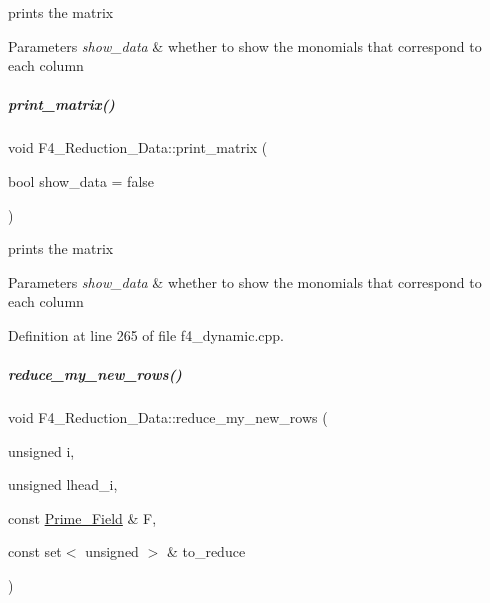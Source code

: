 prints the matrix 


\begin{DoxyParams}{Parameters}
{\em show\+\_\+data} & whether to show the monomials that correspond to each column \\
\hline
\end{DoxyParams}
\mbox{\label{group___g_b_computation_a9f3e9b5617084c34f97acd23d6e67a43}} 
\subparagraph{\texorpdfstring{print\+\_\+matrix()}{print\_matrix()}\hspace{0.1cm}{\footnotesize\ttfamily [2/2]}}
{\footnotesize\ttfamily void F4\+\_\+\+Reduction\+\_\+\+Data\+::print\+\_\+matrix (\begin{DoxyParamCaption}\item[{bool}]{show\+\_\+data = {\ttfamily false} }\end{DoxyParamCaption})}



prints the matrix 


\begin{DoxyParams}{Parameters}
{\em show\+\_\+data} & whether to show the monomials that correspond to each column \\
\hline
\end{DoxyParams}


Definition at line 265 of file f4\+\_\+dynamic.\+cpp.

\mbox{\label{group___g_b_computation_ae75be9f5946c90ea68cbae7276dfd36c}} 
\subparagraph{\texorpdfstring{reduce\+\_\+my\+\_\+new\+\_\+rows()}{reduce\_my\_new\_rows()}}
{\footnotesize\ttfamily void F4\+\_\+\+Reduction\+\_\+\+Data\+::reduce\+\_\+my\+\_\+new\+\_\+rows (\begin{DoxyParamCaption}\item[{unsigned}]{i,  }\item[{unsigned}]{lhead\+\_\+i,  }\item[{const \hyperlink{group___fields_group_class_prime___field}{Prime\+\_\+\+Field} \&}]{F,  }\item[{const set$<$ unsigned $>$ \&}]{to\+\_\+reduce }\end{DoxyParamCaption})\hspace{0.3cm}{\ttfamily [protected]}}



